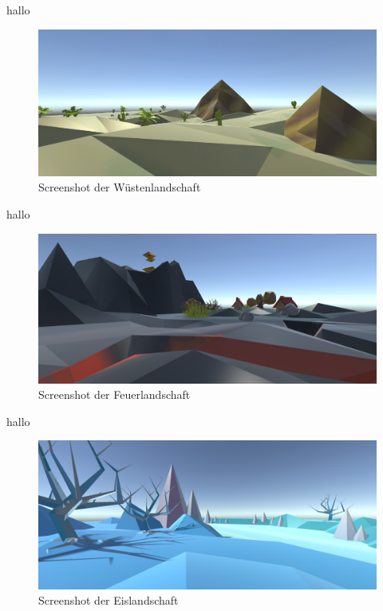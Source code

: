 hallo


\begin{figure}[!htbp]%
	\centering
		\includegraphics[width=1.0\textwidth]{images/Wueste}
	\caption{Screenshot der Wüstenlandschaft}
	\label{fig:Wueste}
\end{figure}

hallo


\begin{figure}[!htbp]%
	\centering
		\includegraphics[width=1.0\textwidth]{images/Feuer}
	\caption{Screenshot der Feuerlandschaft}
	\label{fig:Feuer}
\end{figure}

hallo


\begin{figure}[!htbp]
	\centering
		\includegraphics[width=1.0\textwidth]{images/Eis}
	\caption{Screenshot der Eislandschaft}
	\label{fig:Eis}
\end{figure}

